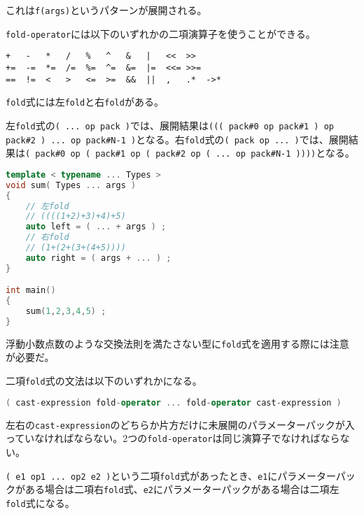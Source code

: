 これは\lstinline!f(args)!というパターンが展開される。

\lstinline!fold-operator!には以下のいずれかの二項演算子を使うことができる。

\begin{lstlisting}
+   -   *   /   %   ^   &   |   <<  >>
+=  -=  *=  /=  %=  ^=  &=  |=  <<= >>=
==  !=  <   >   <=  >=  &&  ||  ,   .*  ->*
\end{lstlisting}

\lstinline!fold!式には左\lstinline!fold!と右\lstinline!fold!がある。

左\lstinline!fold!式の\lstinline!( ... op pack )!では、展開結果は\lstinline[breaklines=true]!((( pack#0 op pack#1 ) op pack#2 ) ... op pack#N-1 )!となる。右\lstinline!fold!式の\lstinline!( pack op ... )!では、展開結果は\lstinline[breaklines=true]!( pack#0 op ( pack#1 op ( pack#2 op ( ... op pack#N-1 ))))!となる。

\begin{lstlisting}[language=C++]
template < typename ... Types >
void sum( Types ... args )
{
    // 左fold
    // ((((1+2)+3)+4)+5)
    auto left = ( ... + args ) ;
    // 右fold
    // (1+(2+(3+(4+5))))
    auto right = ( args + ... ) ;
}

int main()
{
    sum(1,2,3,4,5) ;
}
\end{lstlisting}

浮動小数点数のような交換法則を満たさない型に\lstinline!fold!式を適用する際には注意が必要だ。

二項\lstinline!fold!式の文法は以下のいずれかになる。

\begin{lstlisting}[language=C++]
( cast-expression fold-operator ... fold-operator cast-expression )
\end{lstlisting}

左右の\lstinline!cast-expression!のどちらか片方だけに未展開のパラメーターパックが入っていなければならない。2つの\lstinline!fold-operator!は同じ演算子でなければならない。

\lstinline!( e1 op1 ... op2 e2 )!という二項\lstinline!fold!式があったとき、\lstinline!e1!にパラメーターパックがある場合は二項右\lstinline!fold!式、\lstinline!e2!にパラメーターパックがある場合は二項左\lstinline!fold!式になる。

